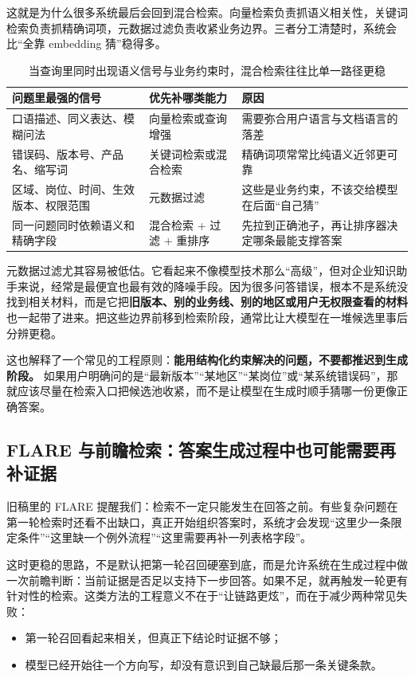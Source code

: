这就是为什么很多系统最后会回到混合检索。向量检索负责抓语义相关性，关键词检索负责抓精确词项，元数据过滤负责收紧业务边界。三者分工清楚时，系统会比“全靠 embedding 猜”稳得多。

\begin{table}[H]
\centering
\small
\begin{tabularx}{\textwidth}{>{\raggedright\arraybackslash}p{3.1cm}>{\raggedright\arraybackslash}p{3.1cm}>{\raggedright\arraybackslash}X}
\toprule
\textbf{问题里最强的信号} & \textbf{优先补哪类能力} & \textbf{原因} \\
\midrule
口语描述、同义表达、模糊问法 & 向量检索或查询增强 & 需要弥合用户语言与文档语言的落差 \\
错误码、版本号、产品名、缩写词 & 关键词检索或混合检索 & 精确词项常常比纯语义近邻更可靠 \\
区域、岗位、时间、生效版本、权限范围 & 元数据过滤 & 这些是业务约束，不该交给模型在后面“自己猜” \\
同一问题同时依赖语义和精确字段 & 混合检索 + 过滤 + 重排序 & 先拉到正确池子，再让排序器决定哪条最能支撑答案 \\
\bottomrule
\end{tabularx}
\caption{当查询里同时出现语义信号与业务约束时，混合检索往往比单一路径更稳}
\label{tab:hybrid-retrieval-metadata}
\end{table}

元数据过滤尤其容易被低估。它看起来不像模型技术那么“高级”，但对企业知识助手来说，经常是最便宜也最有效的降噪手段。因为很多问答错误，根本不是系统没找到相关材料，而是它把\textbf{旧版本、别的业务线、别的地区或用户无权限查看的材料}也一起带了进来。把这些边界前移到检索阶段，通常比让大模型在一堆候选里事后分辨更稳。

这也解释了一个常见的工程原则：\textbf{能用结构化约束解决的问题，不要都推迟到生成阶段。} 如果用户明确问的是“最新版本”“某地区”“某岗位”或“某系统错误码”，那就应该尽量在检索入口把候选池收紧，而不是让模型在生成时顺手猜哪一份更像正确答案。

\subsection{FLARE 与前瞻检索：答案生成过程中也可能需要再补证据}
旧稿里的 FLARE 提醒我们：检索不一定只能发生在回答之前。有些复杂问题在第一轮检索时还看不出缺口，真正开始组织答案时，系统才会发现“这里少一条限定条件”“这里缺一个例外流程”“这里需要再补一列表格字段”。

这时更稳的思路，不是默认把第一轮召回硬塞到底，而是允许系统在生成过程中做一次前瞻判断：当前证据是否足以支持下一步回答。如果不足，就再触发一轮更有针对性的检索。这类方法的工程意义不在于“让链路更炫”，而在于减少两种常见失败：
\begin{itemize}
  \item 第一轮召回看起来相关，但真正下结论时证据不够；
  \item 模型已经开始往一个方向写，却没有意识到自己缺最后那一条关键条款。
\end{itemize}

